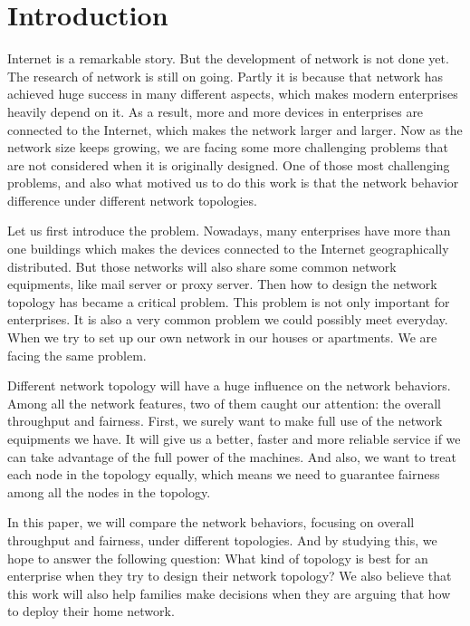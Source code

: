 \section{Introduction} \label{sec:introduction}

Internet is a remarkable story. But the development of network is not done yet. 
The research of network is still on going. 
Partly it is because that network has achieved huge success in many different aspects, 
which makes modern enterprises heavily depend on it. 
As a result, more and more devices in enterprises are connected to the Internet, 
which makes the network larger and larger. Now as the network size keeps growing, 
we are facing some more challenging problems that are not considered when it is originally designed. 
One of those most challenging problems, and also what motived us to do this work is 
that the network behavior difference under different network topologies.

Let us first introduce the problem. 
Nowadays, many enterprises have more than one buildings 
which makes the devices connected to the Internet geographically distributed. 
But those networks will also share some common network equipments, 
like mail server or proxy server. 
Then how to design the network topology has became a critical problem. 
This problem is not only important for enterprises. 
It is also a very common problem we could possibly meet everyday. 
When we try to set up our own network in our houses or apartments. 
We are facing the same problem.

Different network topology will have a huge influence on the network behaviors. 
Among all the network features, two of them caught our attention: 
the overall throughput and fairness. 
First, we surely want to make full use of the network equipments we have. 
It will give us a better, faster and more reliable service 
if we can take advantage of the full power of the machines. 
And also, we want to treat each node in the topology equally, 
which means we need to guarantee fairness among all the nodes in the topology.
 
In this paper, we will compare the network behaviors, 
focusing on overall throughput and fairness, under different topologies. 
And by studying this, we hope to answer the following question: 
What kind of topology is best for an enterprise when they try to design their network topology? 
We also believe that this work will also help families make decisions 
when they are arguing that how to deploy their home network.

